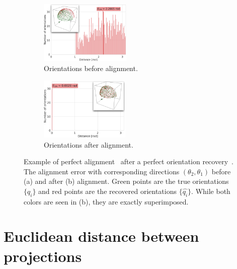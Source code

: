 \begin{figure}[ht!]
\begin{minipage}[t]{0.58\linewidth}
        \begin{subfigure}[t]{0.47\linewidth}
            \centering
            \includegraphics[height=3cm]{figures/BeforeAA.pdf}
            \caption{Orientations before alignment.}
        \end{subfigure}
        \hfill
        \begin{subfigure}[t]{0.47\linewidth}
            \centering
            \includegraphics[height=3cm]{figures/AfterAA.pdf}
            \caption{Orientations after alignment.}
        \end{subfigure}
        \caption{%
            Example of perfect alignment~ after a perfect orientation recovery~.
            The alignment error with corresponding directions $(\theta_2, \theta_1)$ before (a) and after (b) alignment.
            Green points are the true orientations $\{q_i\}$ and red points are the recovered orientations $\{\widehat{q_i}\}$.
            While both colors are seen in (b), they are exactly superimposed.
        }\label{fig:5j0n-aa-loss-perfect-distances}
    \end{minipage}
\end{figure}

\section{Euclidean distance between projections}\label{apx:results:distance-estimation}

